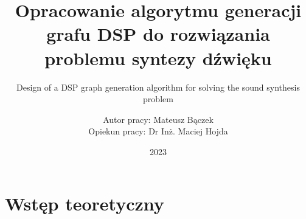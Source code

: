 \documentclass[]{beamer}
\title{Opracowanie algorytmu generacji grafu DSP do rozwiązania problemu syntezy dźwięku}
\subtitle{Design of a DSP graph generation algorithm for solving the sound synthesis problem}
\author{Autor pracy: Mateusz Bączek \\ Opiekun pracy: Dr Inż. Maciej Hojda}
\institute{Seminarium Dyplomowe -- prezentacja 1}
\date{2023}
\begin{document}
\onehalfspacing
\frame{\titlepage}

\section{Wstęp teoretyczny}

\end{document}

